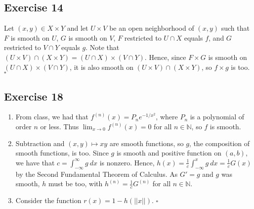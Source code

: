 \documentclass{article}
\begin{document}
\subsection*{Exercise 14}
Let $(x,y) \in X \times Y$ and let $U \times V$ be an open neighborhood of $(x,y)$ such that
$F$ is smooth on $U$, $G$ is smooth on $V$, $F$ restricted to $U \cap X$ equals $f$, and
$G$ restricted to $V \cap Y$ equals $g$. Note that
$(U \times V)\cap(X\times Y)=(U \cap X) \times (V \cap Y)$. Hence, since
$F\times G$ is smooth on
$(U \cap X) \times (V \cap Y)$, it is also smooth on 
$(U \times V)\cap(X\times Y)$, so $f \times g$ is too.
\hfill $\square$

\subsection*{Exercise 18}
\begin{enumerate}[label=\textbf{\alph*}]
\item{
	From class, we had that $f^{(n)}(x) = P_n e^{-1/{x^2}}$, where $P_n$ is a polynomial of order
	$n$ or less. Thus $\lim_{x \to 0} f^{(n)}(x) = 0$ for all $n \in \mathbb{N}$, so $f$ is smooth.
}
\item{
	Subtraction and $(x,y) \mapsto xy$ are smooth functions, so $g$, the composition of smooth functions,
	 is too. Since $g$ is smooth and positive function on $(a,b)$,
	we have that $c=\int_{-\infty}^{\infty}g\ dx$ is nonzero. Hence,
	$h(x) =\frac{1}{c}\int_{-\infty}^{x}g\ dx = \frac{1}{c}G(x)$ by the Second Fundamental Theorem of Calculus.
	As $G' = g$ and $g$ was smooth, $h$ must be too, with $h^{(n)} = \frac{1}{c}G^{(n)}$ for all $n \in \mathbb{N}$.
}
\item{
	Consider the function $r(x)=1-h(\vert\vert x\vert\vert)$.
}
\hfill $\square$
\end{enumerate}
\end{document}
